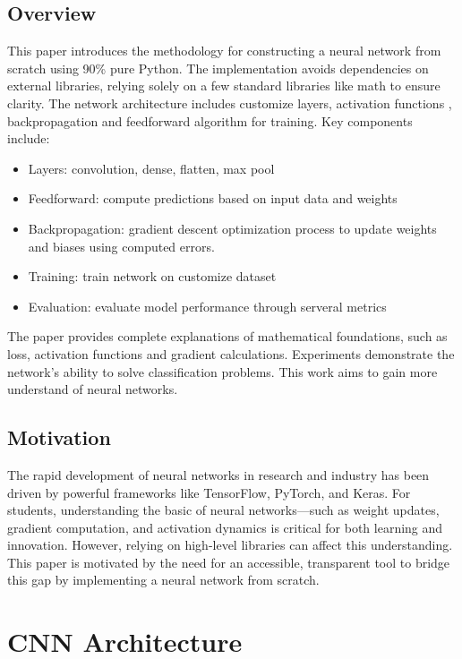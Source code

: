 \documentclass[journal]{IEEEtran} %
\begin{document}
\subsection{Overview}
    This paper introduces the methodology for constructing a neural network from scratch using 90\% pure Python. The implementation avoids dependencies on external libraries, relying solely on a few standard libraries like math to ensure clarity. The network architecture includes customize layers, activation functions , backpropagation and feedforward algorithm for training. Key components include:
    \begin{itemize}
        \item Layers: convolution, dense, flatten, max pool
        \item Feedforward: compute predictions based on input data and weights
        \item Backpropagation: gradient descent optimization process to update weights and biases using computed errors.
        \item Training: train network on customize dataset
        \item Evaluation: evaluate model performance through serveral metrics 
    \end{itemize}

    The paper provides complete explanations of mathematical foundations, such as loss, activation functions and gradient calculations. Experiments demonstrate the network’s ability to solve classification problems. This work aims to gain more understand of neural networks.

\subsection{Motivation}
    The rapid development of neural networks in research and industry has been driven by powerful frameworks like TensorFlow, PyTorch, and Keras. For students, understanding the basic of neural networks—such as weight updates, gradient computation, and activation dynamics is critical for both learning and innovation. However, relying on high-level libraries can affect this understanding. This paper is motivated by the need for an accessible, transparent tool to bridge this gap by implementing a neural network from scratch.


\section{CNN Architecture}
\end{document}

